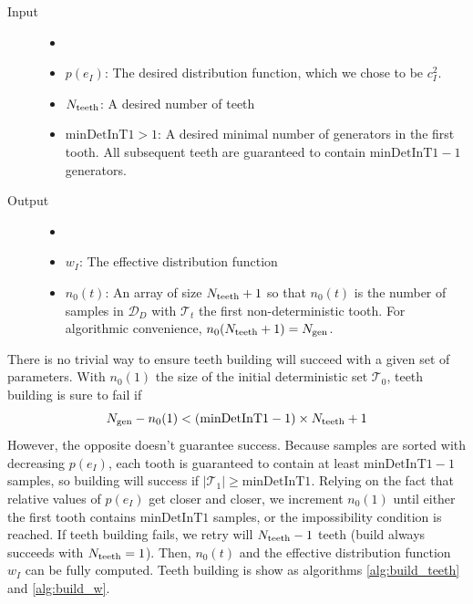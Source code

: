 \documentclass[./thesis.tex]{subfiles}
\newcommand{\minDetInT}{\text{minDetInT1}}
\begin{document}
\begin{description}
\item[Input] 
\begin{itemize}
\item[] \phantom{pouet}
\item $p(e_I)$:
The desired distribution function, which we chose to be $c_I^2$.
\item $N_\text{teeth}$:
A desired number of teeth
\item $\minDetInT > 1$:
A desired minimal number of generators in the first tooth. All subsequent teeth are guaranteed to contain $\minDetInT-1$ generators.
\end{itemize}

\item[Output] 
\begin{itemize}
\item[] \phantom{pouet}
\item $w_I$:
The effective distribution function
\item $n_0(t)$:
An array of size $N_\text{teeth}+1$ so that $n_0(t)$ is the number of samples in $\mathcal{D}_D$ with $\mathcal{T}_t$ the first non-deterministic tooth. For algorithmic convenience, $n_0(N_\text{teeth}+1)={N_\text{gen}}$.
\end{itemize}
\end{description}


There is no trivial way to ensure teeth building will succeed with a given set of parameters. 
With $n_0(1)$ the size of the initial deterministic set $\mathcal{T}_0$, teeth building is sure to fail if 
\begin{equation}
\Ngen - n_0(1) < (\minDetInT - 1) \times \Nteeth + 1
\end{equation}
However, the opposite doesn't guarantee success. Because samples are sorted with decreasing $p(e_I)$, each tooth is guaranteed to contain at least $\minDetInT -1$ samples, so building will success if $|\mathcal{T}_1| \geq \minDetInT$.
Relying on the fact that relative values of $p(e_I)$ get closer and closer, we increment $n_0(1)$ until either the first tooth contains $\minDetInT$ samples, or the impossibility condition is reached.
If teeth building fails, we retry will $N_\text{teeth} - 1$ teeth (build always succeeds with $N_\text{teeth} = 1$).
Then, $n_0(t)$ and the effective distribution function $w_I$ can be fully computed.
Teeth building is show as algorithms \ref{alg:build_teeth} and \ref{alg:build_w}.
\end{document}
